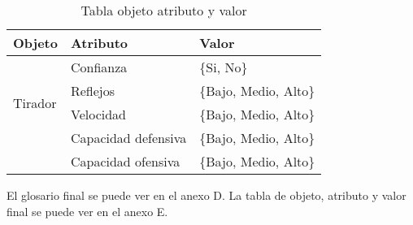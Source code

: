 \begin{table}[]
  \centering
  \caption{Tabla objeto atributo y valor}
  \label{tab:Tabla objeto atributo y valor}
  \begin{tabular}{lll}
    Objeto & Atributo & Valor \\ \hline
    \multicolumn{1}{l|}{\multirow{4}{*}{Tirador}} & Confianza & \{Si, No\} \\ \cline{2-3}
    \multicolumn{1}{l|}{} & Reflejos & \{Bajo, Medio, Alto\} \\ \cline{2-3}
    \multicolumn{1}{l|}{} & Velocidad & \{Bajo, Medio, Alto\} \\ \cline{2-3}
    \multicolumn{1}{l|}{} & Capacidad defensiva & \{Bajo, Medio, Alto\} \\ \cline{2-3}
    \multicolumn{1}{l|}{} & Capacidad ofensiva & \{Bajo, Medio, Alto\} \\ \cline{2-3}
  \end{tabular}
\end{table}


El glosario final se puede ver en el anexo D.
La tabla de objeto, atributo y valor final se puede ver en el anexo E.
